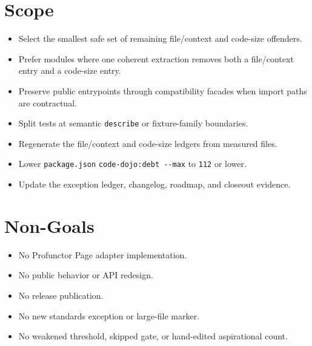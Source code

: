 \section{Scope}\label{record-245-scope}

\begin{itemize}
\tightlist
\item
  Select the smallest safe set of remaining file/context and code-size offenders.
\item
  Prefer modules where one coherent extraction removes both a file/context entry and a code-size entry.
\item
  Preserve public entrypoints through compatibility facades when import paths are contractual.
\item
  Split tests at semantic \texttt{d\allowbreak{}e\allowbreak{}s\allowbreak{}c\allowbreak{}r\allowbreak{}i\allowbreak{}b\allowbreak{}e} or fixture-family boundaries.
\item
  Regenerate the file/context and code-size ledgers from measured files.
\item
  Lower \texttt{p\allowbreak{}a\allowbreak{}c\allowbreak{}k\allowbreak{}a\allowbreak{}g\allowbreak{}e\allowbreak{}.\allowbreak{}j\allowbreak{}s\allowbreak{}o\allowbreak{}n} \texttt{c\allowbreak{}o\allowbreak{}d\allowbreak{}e\allowbreak{}-\allowbreak{}d\allowbreak{}o\allowbreak{}j\allowbreak{}o\allowbreak{}:\allowbreak{}d\allowbreak{}e\allowbreak{}b\allowbreak{}t\allowbreak{} \allowbreak{}-\allowbreak{}-\allowbreak{}m\allowbreak{}a\allowbreak{}x} to \texttt{1\allowbreak{}1\allowbreak{}2} or lower.
\item
  Update the exception ledger, changelog, roadmap, and closeout evidence.
\end{itemize}

\section{Non-Goals}\label{record-245-non-goals}

\begin{itemize}
\tightlist
\item
  No Profunctor Page adapter implementation.
\item
  No public behavior or API redesign.
\item
  No release publication.
\item
  No new standards exception or large-file marker.
\item
  No weakened threshold, skipped gate, or hand-edited aspirational count.
\end{itemize}

